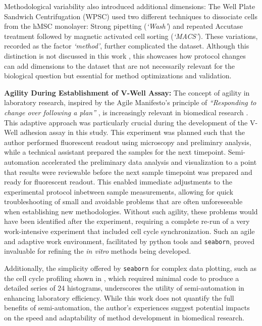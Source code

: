 Methodological variability also introduced additional dimensions: The Well Plate
Sandwich Centrifugation (WPSC) used two different techniques to dissociate
\MAina cells from the hMSC monolayer: Strong pipetting
(\emph{`Wash'}) and repeated Accutase treatment followed by magnetic activated
cell sorting (\emph{`MACS'}). These variations, recorded as the factor
\textit{`method'}, further complicated the dataset. Although this distinction is
not discussed in this work , this
showcases how protocol changes can add dimensions to the dataset that are
not necessarily relevant for the biological question but essential for
method optimizations and validation.



\textbf{Agility During Establishment of V-Well Assay:}
The concept of agility in laboratory research, inspired by the Agile Manifesto's
principle of \emph{``Responding to change over following a plan''}
\cite{ManifestoAgileSoftware2001}, is increasingly relevant in biomedical
research \cite{westReinventingResearchAgile2018,
    quanbeckApplyingConceptsRapid2022}. This adaptive approach was particularly
crucial during the development of the V-Well adhesion assay in this study. This
experiment was planned such that the author performed fluorescent readout using
microscopy and preliminry analysis, while a technical assistant prepared the
samples for the next timepoint. Semi-automation accelerated the preliminary data
analysis and visualization to a point that results were reviewable before the
next sample timepoint was prepared and ready for fluorescent readout. This
enabled immediate adjustments to the experimental protocol inbetween sample
measurements, allowing for quick troubleshooting of small and avoidable problems
that are often unforeseeable when establishing new methodologies. Without such
agility, these problems would have been identified after the experiment,
requiring a complete re-run of a very work-intensive experiment that included cell
cycle synchronization. Such an agile and adaptive work environment, facilitated
by python tools and \texttt{seaborn}, proved invaluable for refining the
\textit{in vitro} methods being developed.

Additionally, the simplicity
offered by \texttt{seaborn} for complex data plotting, such as the cell cycle
profiling shown in , which required minimal code
to produce a detailed series of 24 histograms, underscores the utility of
semi-automation in enhancing laboratory efficiency. While this work does not
quantify the full benefits of semi-automation, the author's experiences suggest
potential impacts on the speed and adaptability of method development in
biomedical research.






